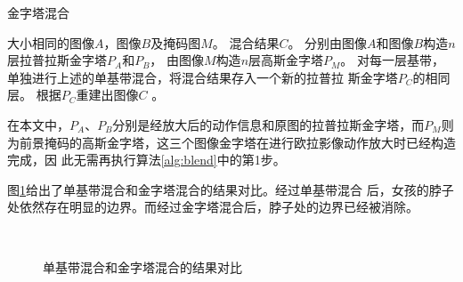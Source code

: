 \begin{algorithm}[htbp]
  \caption{金字塔混合}
  \label{alg:blend}
  \begin{algorithmic}[1]
    \REQUIRE 大小相同的图像$A$，图像$B$及掩码图$M$。
    \ENSURE 混合结果$C$。
    \STATE 分别由图像$A$和图像$B$构造$n$层拉普拉斯金字塔$P_A$和$P_B$，
    由图像$M$构造$n$层高斯金字塔$P_M$。
    \STATE 对每一层基带，单独进行上述的单基带混合，将混合结果存入一个新的拉普拉
    斯金字塔$P_C$的相同层。
    \STATE 根据$P_C$重建出图像$C$ 。
  \end{algorithmic}
\end{algorithm}

在本文中，$P_A$、$P_B$分别是经放大后的动作信息和原图的拉普拉斯金字塔，而$P_M$则
为前景掩码的高斯金字塔，这三个图像金字塔在进行欧拉影像动作放大时已经构造完成，因
此无需再执行算法\ref{alg:blend}中的第1步。

图\ref{fig:blend-compare}给出了单基带混合和金字塔混合的结果对比。经过单基带混合
后，女孩的脖子处依然存在明显的边界。而经过金字塔混合后，脖子处的边界已经被消除。

\clearpage

\begin{figure}[htbp]
  \centering
  \\
  \caption{单基带混合和金字塔混合的结果对比}
  \label{fig:blend-compare}
\end{figure}


